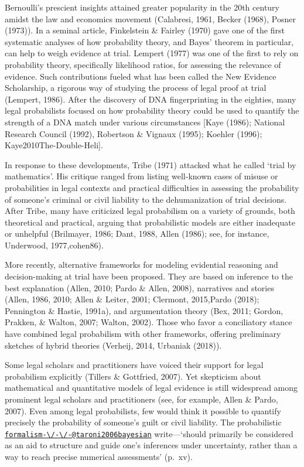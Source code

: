 \documentclass[11pt,dvipsnames,enabledeprecatedfontcommands]{scrartcl}
\begin{document}
Bernoulli's prescient insights attained greater popularity in the 20th
century amidst the law and economics movement (Calabresi, 1961, Becker
(1968), Posner (1973)). In a seminal article, Finkelstein \& Fairley
(1970) gave one of the first systematic analyses of how probability
theory, and Bayes' theorem in particular, can help to weigh evidence at
trial. Lempert (1977) was one of the first to rely on probability
theory, specifically likelihood ratios, for assessing the relevance of
evidence. Such contributions fueled what has been called the New
Evidence Scholarship, a rigorous way of studying the process of legal
proof at trial (Lempert, 1986). After the discovery of DNA
fingerprinting in the eighties, many legal probabilists focused on how
probability theory could be used to quantify the strength of a DNA match
under various circumstances {[}Kaye (1986); National Research Council
(1992), Robertson \& Vignaux (1995); Koehler (1996);
Kaye2010The-Double-Heli{]}.

In response to these developments, Tribe (1971) attacked what he called
`trial by mathematics'. His critique ranged from listing well-known
cases of misuse or probabilities in legal contexts and practical
difficulties in assessing the probability of someone's criminal or civil
liability to the dehumanization of trial decisions. After Tribe, many
have criticized legal probabilism on a variety of grounds, both
theoretical and practical, arguing that probabilistic models are either
inadequate or unhelpful (Brilmayer, 1986; Dant, 1988, Allen (1986); see,
for instance, Underwood, 1977,cohen86).

More recently, alternative frameworks for modeling evidential reasoning
and decision-making at trial have been proposed. They are based on
inference to the best explanation (Allen, 2010; Pardo \& Allen, 2008),
narratives and stories (Allen, 1986, 2010; Allen \& Leiter, 2001;
Clermont, 2015,Pardo (2018); Pennington \& Hastie, 1991a), and
argumentation theory (Bex, 2011; Gordon, Prakken, \& Walton, 2007;
Walton, 2002). Those who favor a conciliatory stance have combined legal
probabilism with other frameworks, offering preliminary sketches of
hybrid theories (Verheij, 2014, Urbaniak (2018)).

Some legal scholars and practitioners have voiced their support for
legal probabilism explicitly (Tillers \& Gottfried, 2007). Yet
skepticism about mathematical and quantitative models of legal evidence
is still widespread among prominent legal scholars and practitioners
(see, for example, Allen \& Pardo, 2007). Even among legal probabilists,
few would think it possible to quantify precisely the probability of
someone's guilt or civil liability. The probabilistic
\href{mailto:formalism---@taroni2006bayesian}{\nolinkurl{formalism-\/-\/-@taroni2006bayesian}}
write---`should primarily be considered as an aid to structure and guide
one's inferences under uncertainty, rather than a way to reach precise
numerical assessments' (p.~xv).
\end{document}
